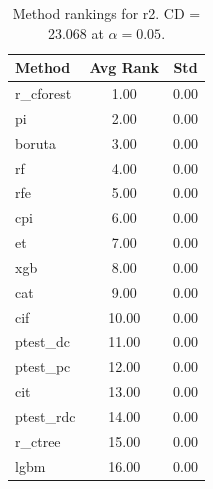 \begin{table}[h]
\centering
\caption{Method rankings for r2. CD = 23.068 at $\alpha=0.05$.}
\label{tab:ranks_r2}
\begin{tabular}{lcc}
\toprule
Method & Avg Rank & Std \\
\midrule
r_cforest & 1.00 & 0.00 \\
pi & 2.00 & 0.00 \\
boruta & 3.00 & 0.00 \\
rf & 4.00 & 0.00 \\
rfe & 5.00 & 0.00 \\
cpi & 6.00 & 0.00 \\
et & 7.00 & 0.00 \\
xgb & 8.00 & 0.00 \\
cat & 9.00 & 0.00 \\
cif & 10.00 & 0.00 \\
ptest_dc & 11.00 & 0.00 \\
ptest_pc & 12.00 & 0.00 \\
cit & 13.00 & 0.00 \\
ptest_rdc & 14.00 & 0.00 \\
r_ctree & 15.00 & 0.00 \\
lgbm & 16.00 & 0.00 \\
\bottomrule
\end{tabular}
\end{table}